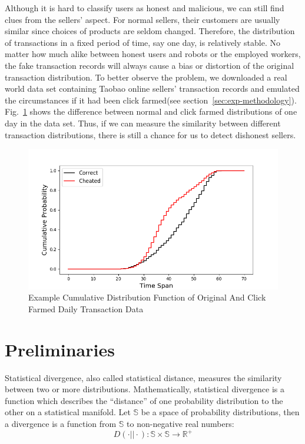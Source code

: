 \documentclass[10pt,conference,letterpaper]{IEEEtran}
\begin{document}
			Although it is hard to classify users as honest and malicious, we can still find clues from the sellers' aspect. For normal sellers, their customers are usually similar since choices of products are seldom changed. Therefore, the distribution of transactions in a fixed period of time, say one day, is relatively stable. No matter how much alike between honest users and robots or the employed workers, the fake transaction records will always cause a bias or distortion of the original transaction distribution. To better observe the problem, we downloaded a real world data set containing Taobao online sellers' transaction records and emulated the circumstances if it had been click farmed(see section~\ref{sec:exp-methodology}). Fig.~\ref{fig:example-ecdf} shows the difference between normal and click farmed distributions of one day in the data set.
			Thus, if we can measure the similarity between different transaction distributions, there is still a chance for us to detect dishonest sellers.
	
			\begin{figure}[!t]
				\centering
				\includegraphics[width=\linewidth]{fig/ExampleCDF.png}
				\caption{Example Cumulative Distribution Function of Original And Click Farmed Daily Transaction Data}
				\label{fig:example-ecdf}
			\end{figure}
	
	\section{Preliminaries}\label{sec:preliminaries}
		Statistical divergence, also called statistical distance, measures the similarity between two or more distributions.
		Mathematically, statistical divergence is a function which describes the ``distance'' of one probability distribution to the other on a statistical manifold. Let $\mathbb{S}$ be a space of probability distributions, then a divergence is a function from $\mathbb{S}$ to non-negative real numbers: 
		\begin{equation}
			D(\cdot || \cdot): \mathbb{S} \times \mathbb{S} \rightarrow \mathbb{R^+}
		\end{equation}
	
\end{document}

